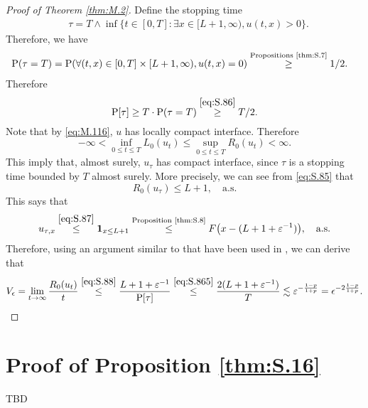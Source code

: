 \documentclass[12pt,a4paper]{amsart}
\numberwithin{equation}{section}
\theoremstyle{plain}
\theoremstyle{remark}
\begin{document}
\begin{proof}[Proof of Theorem \ref{thm:M.2}]
	
	Define the stopping time
\begin{align} \label{eq:S.85}
& \tau =T \wedge \inf\{t\in [0,T]: \exists x\in [L+1,\infty), u(t,x) > 0\}.
\end{align}
	Therefore, we have 
\begin{align} \label{eq:S.86}
	&\mathrm P( \tau=T) 
	=\mathrm P(\forall (t,x)\in [0,T] \times [L+1,\infty), u(t,x) = 0)
	\overset{\text{Propositions \ref{thm:S.7}}}\geq 1/2.
\end{align}
	Therefore
\begin{equation} \label{eq:S.865}
	\mathrm P[\tau] \geq T \cdot \mathrm P(\tau = T) 
	\overset{\eqref{eq:S.86}}\geq  T/2.
\end{equation}
	Note that by \eqref{eq:M.116}, $u$ has locally compact interface.  
	Therefore \[-\infty<\inf_{0\leq t\leq T} L_0(u_t)\leq \sup_{0\leq t\leq T} R_0(u_t)< \infty.\]
	This imply that, almost surely, $u_\tau$ has compact interface, since $\tau$ is a stopping time bounded by $T$ almost surely.
	More precisely, we can see from \eqref{eq:S.85} that 
\begin{equation}\label{eq:S.87}
	R_0(u_\tau) \leq L + 1, \quad \text{a.s.}
\end{equation}
	This says that 
\begin{equation}\label{eq:S.88}
	u_{\tau,x} 
	\overset{\eqref{eq:S.87}}\leq \mathbf 1_{x\leq L+1}
	\overset{\text{Proposition \ref{thm:S.8}}}\leq F\big(x-(L+1+ \varepsilon^{-1})\big), \quad \text{a.s.}
\end{equation}	
	Therefore, using an argument similar to that have been used in \cite[(3.7)]{MuellerMytnikQuastel2011Effect}, we can derive that
\[
	V_{\epsilon} = \lim_{t\to \infty} \frac{R_0(u_{t})}{t} 
	\overset{\eqref{eq:S.88}}\leq \frac{L+1 + \varepsilon^{-1}}{\mathrm P[\tau]}
	\overset{\eqref{eq:S.865}}\leq \frac{2(L+1+\varepsilon^{-1})}{T}
	\lesssim \varepsilon^{-\frac{1-p}{1+p}} 
	= \epsilon^{-2\frac{1-p}{1+p}}.
	\qedhere
\]
\end{proof}

\section{Proof of Proposition \ref{thm:S.16}}

{\color{red} TBD}
\end{document}
